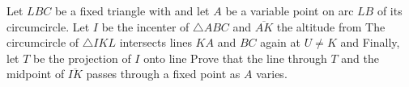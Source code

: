 Let $LBC$ be a fixed triangle with  and let $A$ be a variable point on arc $LB$ of its circumcircle. Let $I$ be the incenter of $\triangle ABC$ and $\overline{AK}$ the altitude from  The circumcircle of $\triangle IKL$ intersects lines $KA$ and $BC$ again at $U \neq K$ and  Finally, let $T$ be the projection of $I$ onto line  Prove that the line through $T$ and the midpoint of $\overline{IK}$ passes through a fixed point as $A$ varies.